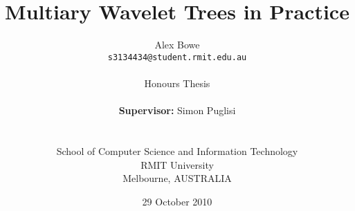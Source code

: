 \documentclass[a4paper]{article}
\begin{document}
\title{Multiary Wavelet Trees in Practice}
\author{Alex Bowe\\
\texttt{s3134434@student.rmit.edu.au} \\ \\
Honours Thesis \\ \\
\textbf{Supervisor:} Simon Puglisi\\ \\ \\
School of Computer Science and Information Technology \\
RMIT University\\
Melbourne, AUSTRALIA}
\date{29 October 2010}


\maketitle

\begin{abstract}

\end{abstract}




\newpage
\tableofcontents
\newpage





%







\appendix




\end{document}

